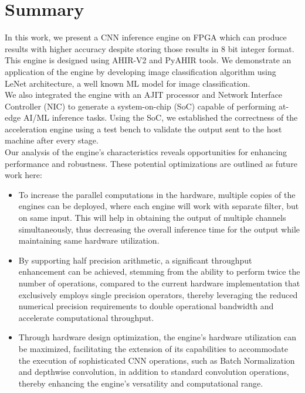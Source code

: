 
\chapter{Summary}\doublespacing %

\label{Chapter5} %

In this work, we present a CNN inference engine on FPGA which can produce results with higher accuracy despite storing those results in 8 bit integer format. This engine is designed using AHIR-V2 and PyAHIR tools. We demonstrate an application of the engine by developing image classification algorithm using LeNet architecture, a well known ML model for image classification.
\\
We also integrated the engine with an AJIT processor and Network Interface Controller (NIC) to generate a system-on-chip (SoC) capable of performing at-edge AI/ML inference tasks. Using the SoC, we established the correctness of the acceleration engine using a test bench to validate the output sent to the host machine after every stage.\\
Our analysis of the engine's characteristics reveals opportunities for enhancing performance and robustness. These potential optimizations are outlined as future work here:
\begin{itemize}
    \item To increase the parallel computations in the hardware, multiple copies of the engines can be deployed, where each engine will work with separate filter, but on same input. This will help in obtaining the output of multiple channels simultaneously, thus decreasing the overall inference time for the output while maintaining same hardware utilization.
    \item By supporting half precision arithmetic, a significant throughput enhancement can be achieved, stemming from the ability to perform twice the number of operations, compared to the current hardware implementation that exclusively employs single precision operators, thereby leveraging the reduced numerical precision requirements to double operational bandwidth and accelerate computational throughput. 
    \item Through hardware design optimization, the engine's hardware utilization can be maximized, facilitating the extension of its capabilities to accommodate the execution of sophisticated CNN operations, such as Batch Normalization and depthwise convolution, in addition to standard convolution operations, thereby enhancing the engine's versatility and computational range.
\end{itemize}




